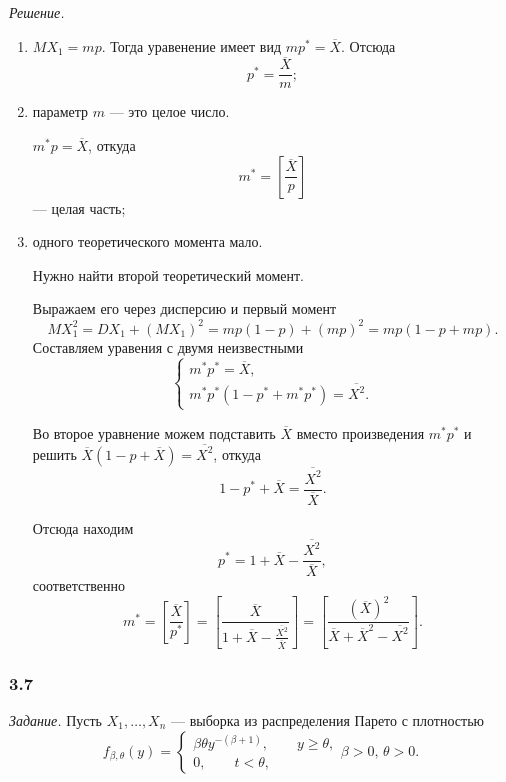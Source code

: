 \textit{Решение.}
\begin{enumerate}[label=\alph*)]
  \item $MX_1 = mp$.
  Тогда уравенение имеет вид $mp^* = \overline{X}$.
  Отсюда
  $$p^* =
    \frac{ \overline{X}}{m};$$
  \item параметр $m$ --- это целое число.

  $m^* p = \overline{X}$, откуда
  $$m^* =
    \left[ \frac{ \overline{X}}{p} \right] $$
  --- целая часть;
  \item одного теоретического момента мало.

  Нужно найти второй теоретический момент.

  Выражаем его через дисперсию и первый момент
  $$MX_1^2 =
    DX_1 + \left( MX_1 \right)^2 =
    mp \left( 1 - p \right) + \left( mp \right)^2 =
    mp \left( 1 - p + mp \right).$$
  Составляем уравения с двумя неизвестными
  $$ \begin{cases}
      m^* p^* = \overline{X}, \\
      m^* p^* \left( 1 - p^* + m^* p^* \right) = \overline{X^2}.
    \end{cases}$$

  Во второе уравнение можем подставить $ \overline{X}$ вместо произведения $m^* p^*$ и решить
  $ \overline{X} \left( 1 - p + \overline{X} \right) = \overline{X^2}$, откуда
  $$1 - p^* + \overline{X} =
    \frac{ \overline{X^2}}{ \overline{X}}.$$

  Отсюда находим
  $$p^* =
    1 + \overline{X} - \frac{ \overline{X^2}}{ \overline{X}},$$
  соответственно
  $$m^* =
    \left[ \frac{ \overline{X}}{p^*} \right] =
    \left[ \frac{ \overline{X}}{1 + \overline{X} - \frac{ \overline{X^2}}{ \overline{X}}} \right] =
    \left[
      \frac{ \left( \overline{X} \right)^2}{ \overline{X} + \overline{X}^2 - \overline{X^2}}
    \right].$$
\end{enumerate}

\subsubsection*{3.7}

\textit{Задание.} Пусть $X_1, \dotsc, X_n$ --- выборка из распределения Парето с плотностью
$$f_{ \beta, \theta } \left( y \right) =
  \begin{cases}
    \beta \theta y^{- \left( \beta + 1 \right) }, \qquad y \geq \theta, \\
    0, \qquad t < \theta,
  \end{cases}
  \beta > 0, \,
  \theta > 0.$$

